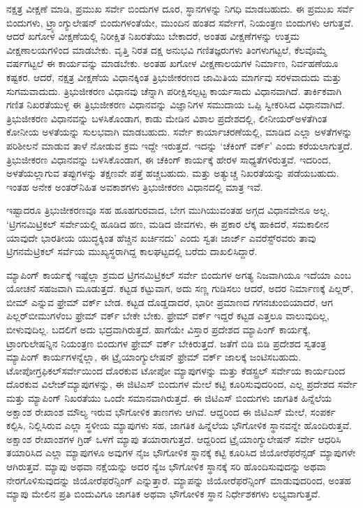 ನಕ್ಷತ್ರ ವೀಕ್ಷಣೆ ಮಾಡಿ, ಪ್ರಮುಖ ಸರ್ವೇ ಬಿಂದುಗಳ ದೂರ, ಸ್ಥಾನಗಳನ್ನು ನಿಗಧಿ ಮಾಡಬಹುದು. ಈ ಪ್ರಮುಖ ಸರ್ವೆ ಬಿಂದುಗಳು, ಟ್ರ್ಯಾಂಗ್ಯುಲೇಷನ್​ ಬಿಂದುಗಳಂತೆಯೇ, ಮುಂದಿನ ಹಂತದ ಸರ್ವೇಗೆ, ನಿಯಂತ್ರಣ ಬಿಂದುಗಳು ಆಗುತ್ತವೆ. ಆದರೆ ಖಗೋಳ ವೀಕ್ಷಣೆಯಲ್ಲಿ ನಿರೀಕ್ಷಿತ ನಿಖರತೆಯು ಬೇಕಾದರೆ, ಅಂತಹ ವೀಕ್ಷಣೆಗಳನ್ನು ಉತ್ತಮ ವೀಕ್ಷಣಾಲಯಗಳಿಂದ ಮಾಡಬೇಕು. ವೃತ್ತಿ ನಿರತ ದಕ್ಷ ಅನುಭವಿ ಗಣಿತಜ್ಞರುಗಳು ತಿಂಗಳುಗಟ್ಟಲೆ, ಕೆಲವೊಮ್ಮೆ ವರ್ಷಗಟ್ಟಲೆ ಈ ಕಾರ್ಯವನ್ನು ಮಾಡಬೇಕು. ಅಂತಹ ಖಗೋಳ ವೀಕ್ಷಣಾಲಯಗಳ ನಿರ್ಮಾಣ, ನಿರ್ವಹಣೆಯೂ ಕಷ್ಟಕರ. ಆದರೆ, ನಕ್ಷತ್ರ ವೀಕ್ಷಣೆಯ ವಿಧಾನಕ್ಕಿಂತ ತ್ರಿಭುಜೀಕರಣದ ಜಾಮಿತಿಯ ಮಾರ್ಗವು ಸರಳವಾದುದು ಮತ್ತು ಸುಗಮವಾದುದು. ತ್ರಿಭುಜೀಕರಣ ವಿಧಾನವು ಚೆನ್ನಾಗಿ ಪರೀಕ್ಷಿಸಲ್ಪಟ್ಟ ಕಾರ್ಯಸಾದು ವಿಧಾನವಾಗಿದೆ. ತಾರ್ಕಿಕವಾಗಿ ಗಣಿತ ನಿಖರತೆಯುಳ್ಳ ಈ ತ್ರಿಭುಜೀಕರಣ ವಿಧಾನವನ್ನು ವಿಜ್ಞಾನಿಗಳ ಸಮುದಾಯ ಒಪ್ಪಿ ಸ್ವೀಕರಿಸಿದ ವಿಧಾನವಾಗಿದೆ. ತ್ರಿಭುಜೀಕರಣ ವಿಧಾನವನ್ನು ಬಳಸಿಕೊಂಡಾಗ, ಕಾಡು ಮೇಡಿನ ವಿಶಾಲ ಪ್ರದೇಶದಲ್ಲಿ, ಲೀನೀಯರ್​ ಅಳತೆಗಿಂತ ಕೋನೀಯ ಅಳತೆಯನ್ನು ಸುಲಭವಾಗಿ ಮಾಡಬಹುದು. ಸರ್ವೇ ಕಾರ್ಯಾಚರಣೆಯಲ್ಲಿ, ಮಾಡಿದ ಎಲ್ಲಾ ಅಳತೆಗಳನ್ನು ಪರಿಶೀಲನೆ ಮಾಡುವ ತಾಳೆ ನೋಡುವ ಕ್ರಮ ಇದ್ದೇ ಇರುತ್ತದೆ. ಇದನ್ನು ‘ಚೆಕಿಂಗ್​ ವರ್ಕ್’ ಎಂದು ಕರೆಯಲಾಗುತ್ತದೆ. ತ್ರಿಭುಜೀಕರಣ ವಿಧಾನವನ್ನು ಬಳಸಿಕೊಂಡಾಗ, ಈ ಚೆಕಿಂಗ್​ ಕಾರ್ಯಕ್ಕೆ ಹೇರಳ ಸಾಧ್ಯತೆಗಳಿರುತ್ತವೆ. ಇದರಿಂದ, ಅಳತೆಯಲ್ಲಾಗುವ ತಪ್ಪುಗಳನ್ನು ತಕ್ಷಣವೇ ಪತ್ತೆ ಹಚ್ಚಬಹುದು. ಮತ್ತು ಅತ್ಯುಚ್ಚ ನಿಖರತೆಯನ್ನು ಪಡೆಯಬಹುದು. ಇಂತಹ ಅನೇಕ ಅಂತರ್​ನಿಹಿತ ಅವಕಾಶಗಳು ತ್ರಿಭುಜೀಕರಣ ವಿಧಾನದಲ್ಲಿ ಮಾತ್ರ ಇವೆ.

\newpage

ಇಷ್ಟಾದರೂ ತ್ರಿಭುಜೀಕರಣವೂ ಸಹ ಹೂಹಗುರವಾದ, ಬೇಗ ಮುಗಿಯುವಂತಹ ಅಗ್ಗದ ವಿಧಾನವೇನೂ ಅಲ್ಲ. ‘ಟ್ರಿಗನಮಿಟ್ರಿಕಲ್​ ಸರ್ವೇಯಲ್ಲಿ ಹೂಡಿದ ಹಣ, ಮಡಿದ ಜೀವಗಳು, ಈ ಪ್ರಕಾರ ಲೆಕ್ಕ ಹಾಕಿದರೆ, ಸಮಕಾಲೀನ ಯಾವುದೇ ಭಾರತೀಯ ಯುದ್ಧಕ್ಕಿಂತ ಹೆಚ್ಚಿನ ಖರ್ಚಿನದು’ ಎಂದು ಸ್ವತಃ ಜಾರ್ಜ್ ಎವರೆಸ್ಟ್​ರವರು ತಾವು ಟ್ರಿಗನಮೆಟ್ರಿಕಲ್ ಸರ್ವೆಯ ಮುಖ್ಯಸ್ಥರಾಗಿದ್ದ ಕಾಲಘಟ್ಟದಲ್ಲಿ ಬರೆದು ದಾಖಲಿಸಿದ್ದಾರೆ.

\vskip 5pt

ಮ್ಯಾಪಿಂಗ್​ ಕಾರ್ಯಕ್ಕೆ ಇಷ್ಟೆಲ್ಲಾ ಶ್ರಮದ ಟ್ರಿಗನಮಿಟ್ರಿಕಲ್​ ಸರ್ವೇ ಬಿಂದುಗಳ ಅಗತ್ಯ ನಿಜವಾಗಿಯೂ ಇದೆಯಾ ಎಂಬ ಯೋಚನೆ ಸಹಜವಾಗಿ ಮೂಡುತ್ತದೆ. ಕಟ್ಟಡ ಕಟ್ಟುವಾಗ, ಅದು ಸಣ್ಣ ಗುಡಿಸಲು ಆದರೆ, ಅದರ ನಿರ್ಮಾಣಕ್ಕೆ ಪಿಲ್ಲರ್​, ಬೀಮ್ ಎನ್ನುವ ಫ್ರೇಮ್ ವರ್ಕ್ ಬೇಡ. ಕಟ್ಟಡ ದೊಡ್ಡದಾದರೆ, ಭಾರೀ ಪ್ರಮಾಣದ ಗಗನಚುಂಬಿಯಾದರೆ, ಆಗ ಪಿಲ್ಲರ್​ ಬೀಮುಗಳೆಂಬ ಫ್ರೇಮ್ ವರ್ಕ್ ಬೇಕೇ ಬೇಕು. ಫ್ರೇಮ್ ವರ್ಕ್ ಇದ್ದರೆ ಕಟ್ಟಡ ಎತ್ತಲೂ ವಾಲುವುದಿಲ್ಲ, ಬೀಳುವುದಿಲ್ಲ. ಬದಲಿಗೆ ಅದು ಭದ್ರವಾಗಿರುತ್ತದೆ. ಹಾಗೆಯೇ ವಿಸ್ತಾರ ಪ್ರದೇಶದ ಮ್ಯಾಪಿಂಗ್​ ಕಾರ್ಯಕ್ಕೆ, ಟ್ರಾಂಗುಲೇಷನ್ನಿನ ನಿಯಂತ್ರಣ ಬಿಂದುಗಳ ಫ್ರೇಮ್ ವರ್ಕ್ ಬೇಕಿರುತ್ತದೆ. ಜತೆಗೆ ಬಿಡಿ ಬಿಡಿ ಪ್ರದೇಶದ ಸ್ವತಂತ್ರ ಮ್ಯಾಪಿಂಗ್​ ಕಾರ್ಯಗಳನ್ನೆಲ್ಲಾ, ಈ ಟ್ರೈಯಾಂಗ್ಯುಲೇಷನ್​ ಫ್ರೇಮ್ ವರ್ಕ್ ಜಾಲಕ್ಕೆ ಜಂಟಿಸಬಹುದು. ಟೋಪೋಗ್ರಫಿಕಲ್​ ಸರ್ವೇಯಿಂದ ದೊರಕುವ ಟೋಪೋ ಮ್ಯಾಪುಗಳನ್ನು ಮತ್ತು ಕೆಡಸ್ಟ್ರಲ್​ ಸರ್ವೇಯ ಕಾರ್ಯದಿಂದ ದೊರಕುವ ವಿಲೇಜ್​ ಮ್ಯಾಪುಗಳನ್ನು, ಈ ಜಿಟಿಎಸ್​ ಬಿಂದುಗಳ ಮೇಲೆ ಕಟ್ಟಿ ಕೂರಿಸುವುದರಿಂದ, ಎಲ್ಲ ಪ್ರದೇಶದ ಸರ್ವೇ ಮತ್ತು ಮ್ಯಾಪಿಂಗ್​ ನಿಖರತೆಯು ಒಂದೇ ಸಮಾನವಾಗಿರುತ್ತದೆ. ಈ ಜಿಟಿಎಸ್​ ಬಿಂದುಗಳು ಜಾಗತಿಕ ಹಿನ್ನೆಲೆಯ ಅಕ್ಷಾಂಶ ರೇಖಾಂಶ ಮೌಲ್ಯ ಇರುವ ಭೌಗೋಳಿಕ ತಾಣಗಳು ಆಗಿವೆ. ಆದ್ದರಿಂದ ಈ ಜಿಟಿಎಸ್​ ಮೇಲೆ, ಸಂಪರ್ಕ ಕಲ್ಪಿಸಿ, ನಿಲ್ಲಿಸಿರುವ ಎಲ್ಲಾ ಸ್ಥಳೀಯ ಮ್ಯಾಪುಗಳು ಸಹ, ಜಾಗತಿಕ ಹಿನ್ನೆಲೆಯ ಭೌಗೋಳಿಕ ಸ್ಥಾನವನ್ನೇ ಹೊಂದಿರುತ್ತವೆ. ಅಕ್ಷಾಂಶ ರೇಖಾಂಶಗಳ ಗ್ರಿಡ್​ ಒಳಗೆ ಮ್ಯಾಪು ತಯಾರಾಗುತ್ತದೆ. ಆದ್ದರಿಂದ ಟ್ರೈಯಾಂಗ್ಯುಲೇಷನ್​ ಸರ್ವೇ ಆಧರಿಸಿ ತಯಾರಿಸಿದ ಎಲ್ಲಾ ಮ್ಯಾಪುಗಳೂ ಅವುಗಳ ನೈಜ ಭೌಗೋಳಿಕ ಸ್ಥಾನಕ್ಕೆ ಕಟ್ಟಿ ಕೂರಿಸಿದ ಜಿಯೋರೆಫರೆನ್ಸಡ್​ ಮ್ಯಾಪುಗಳೇ ಆಗಿರುತ್ತವೆ. ಮ್ಯಾಪು ಅಥವಾ ನಕ್ಷೆಯನ್ನು ಅದರ ನ್ಯೆಜ ಭೌಗೋಳಿಕ ಸ್ಥಾನಕ್ಕೆ ಸರಿ ಹೊಂದಿಸುವುದನ್ನು ಅಥವಾ ನೇರಗೊಳಿಸುವುದನ್ನು ಜಿಯೋರೆಫರೆನ್ಸಿಂಗ್​ ಎನ್ನುತ್ತಾರೆ. ಮ್ಯಾಪನ್ನು ಜಿಯೋರೆಫರೆನ್ಸಿಂಗ್​ ಮಾಡುವುದರಿಂದ, ಅಂತಹ ಮ್ಯಾಪು ಮೇಲಿನ ಪ್ರತಿ ಬಿಂದುವಿಗೂ ಜಾಗತಿಕ ಅಥವಾ ಭೌಗೋಳಿಕ ಸ್ಥಾನ ನಿರ್ಧೇಶಕಗಳು ಲಭ್ಯವಾಗುತ್ತವೆ.

